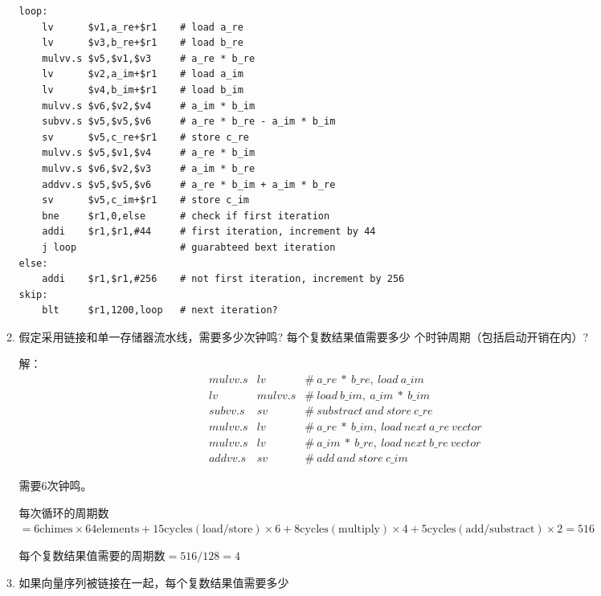 \documentclass{ctexart}
\begin{document}
\begin{enumerate}
\begin{enumerate}
\begin{lstlisting}[language={[x86masm]Assembler}]
loop:
    lv      $v1,a_re+$r1    # load a_re
    lv      $v3,b_re+$r1    # load b_re
    mulvv.s $v5,$v1,$v3     # a_re * b_re 
    lv      $v2,a_im+$r1    # load a_im
    lv      $v4,b_im+$r1    # load b_im
    mulvv.s $v6,$v2,$v4     # a_im * b_im   
    subvv.s $v5,$v5,$v6     # a_re * b_re - a_im * b_im
    sv      $v5,c_re+$r1    # store c_re
    mulvv.s $v5,$v1,$v4     # a_re * b_im
    mulvv.s $v6,$v2,$v3     # a_im * b_re
    addvv.s $v5,$v5,$v6     # a_re * b_im + a_im * b_re
    sv      $v5,c_im+$r1    # store c_im
    bne     $r1,0,else      # check if first iteration
    addi    $r1,$r1,#44     # first iteration, increment by 44
    j loop                  # guarabteed bext iteration
else:
    addi    $r1,$r1,#256    # not first iteration, increment by 256
skip:
    blt     $r1,1200,loop   # next iteration?
\end{lstlisting}
              \item  假定采用链接和单一存储器流水线，需要多少次钟鸣?
                    每个复数结果值需要多少 个时钟周期（包括启动开销在内）?
                    \par 解：
                    $$
                        \begin{array}{lll}
                            mulvv.s & lv      & \#\ a\_re\ *\ b\_re,\ load\ a\_im               \\
                            lv      & mulvv.s & \#\ load\ b\_im,\ a\_im\ *\ b\_im               \\
                            subvv.s & sv      & \#\ substract\ and\ store\ c\_re                \\
                            mulvv.s & lv      & \#\ a\_re\ *\ b\_im,\ load\ next\ a\_re\ vector \\
                            mulvv.s & lv      & \#\ a\_im\ *\ b\_re,\ load\ next\ b\_re\ vector \\
                            addvv.s & sv      & \#\ add\ and\ store\ c\_im
                        \end{array}
                    $$
                    \par 需要6次钟鸣。
                    \par 每次循环的周期数$=6\mathrm{chimes}\times 64\mathrm{elements}+15\mathrm{cycles(load/store)}
                        \times6+8\mathrm{cycles(multiply)}\times 4+5\mathrm{cycles(add/substract)}
                        \times 2=516$
                    \par 每个复数结果值需要的周期数$=516/128=4$
              \item 如果向量序列被链接在一起，每个复数结果值需要多少

\end{enumerate}
\end{enumerate}
\end{document}
